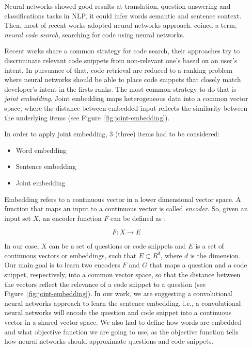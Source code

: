 \documentclass[sigconf]{acmart}
\begin{document}
Neural networks showed good results at translation, question-answering and classifications tasks in NLP, it could infer words semantic and sentence context. Then, most of recent works adopted neural networks approach. \cite{cambronero-deep-code-search-2019} coined a term, \emph{neural code search}, searching for code using neural networks.

Recent works share a common strategy for code search, their approaches try to discriminate relevant code snippets from non-relevant one's based on an user's intent. In pursuance of that, code retrieval are reduced to a ranking problem where neural networks should be able to place code snippets that closely match developer's intent in the firsts ranks. The most common strategy to do that is \emph{joint embedding}. Joint embedding maps heterogeneous data into a common vector space, where the distance between embedded input reflects the similarity between the underlying items \cite{li-joint-embedding-images-2015} (see Figure~\ref{fig:joint-embedding}).

In order to apply joint embedding, 3 (three) items had to be considered:

\begin{itemize}
    \item Word embedding
    \item Sentence embedding
    \item Joint embedding
\end{itemize}

Embedding refers to a continuous vector in a lower dimensional vector space. A function that maps an input to a continuous vector is called \emph{encoder}. So, given an input set $X$, an encoder function $F$ can be defined as \cite{cambronero-deep-code-search-2019}:

\begin{equation}
    F: X \to E
\end{equation}

In our case, $X$ can be a set of questions or code snippets and $E$ is a set of continuous vectors or embeddings, such that $E \subset R^{d}$, where $d$ is the dimension. Our main goal is to learn two encoders $F$ and $G$ that maps a question and a code snippet, respectively, into a common vector space, so that the distance between the vectors reflect the relevance of a code snippet to a question (see Figure~\ref{fig:joint-embedding}). In our work, we are suggesting a convolutional neural networks approach to learn the sentence embedding, i.e., a convolutional neural networks will encode the question and code snippet into a continuous vector in a shared vector space. We also had to define how words are embedded and what objective function we are going to use, as the objective function tells how neural networks should approximate questions and code snippets.
\end{document}
